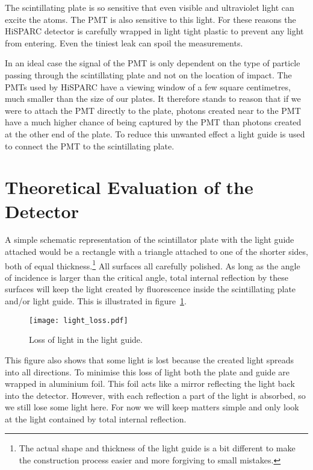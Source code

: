 The scintillating plate is so sensitive that even visible and ultraviolet light can excite the atoms. The PMT is also sensitive to this light. For these reasons the HiSPARC detector is carefully wrapped in light tight plastic to prevent any light from entering. Even the tiniest leak can spoil the measurements.

In an ideal case the signal of the PMT is only dependent on the type of particle passing through the scintillating plate and not on the location of impact. The PMTs used by HiSPARC have a viewing window of a few square centimetres, much smaller than the size of our plates. It therefore stands to reason that if we were to attach the PMT directly to the plate, photons created near to the PMT have a much higher chance of being captured by the PMT than photons created at the other end of the plate. To reduce this unwanted effect a light guide is used to connect the PMT to the scintillating plate.

\section{Theoretical Evaluation of the Detector}
A simple schematic representation of the scintillator plate with the light guide attached would be a rectangle with a triangle attached to one of the shorter sides, both of equal thickness.\footnote{The actual shape and thickness of the light guide is a bit different to make the construction process easier and more forgiving to small mistakes.} All surfaces all carefully polished. As long as the angle of incidence is larger than the critical angle, total internal reflection by these surfaces will keep the light created by fluorescence inside the scintillating plate and/or light guide. This is illustrated in figure~\ref{fig:light_loss}.

\begin{figure}\begin{center}
\texttt{[image: light\_loss.pdf]}%
\caption{Loss of light in the light guide.}\label{fig:light_loss}
\end{center}\end{figure}

This figure also shows that some light is lost because the created light spreads into all directions. To minimise this loss of light both the plate and guide are wrapped in aluminium foil. This foil acts like a mirror reflecting the light back into the detector. However, with each reflection a part of the light is absorbed, so we still lose some light here. For now we will keep matters simple and only look at the light contained by total internal reflection.

